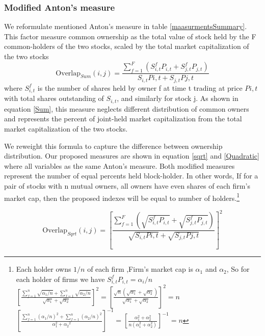\documentclass[12pt, a4paper]{article}
\begin{document}
\subsubsection{Modified Anton's measure }
We reformulate mentioned Anton's measure in table \ref{maasurmentsSummary}. This factor measure common ownership as the total value of
stock held by the F common-holders of the two stocks, scaled by the total market capitalization of the two stocks
\begin{equation}
	\text{Overlap}_{Sum}(i, j) = \frac{\sum_{f = 1}^{F} (S^f_{i,t}P_{i,t}+S^f_{j,t}P_{j,t})}{S_{i,t}P{i,t} + S_{j,t}P{j,t}}
	\label{Sum}
\end{equation}
where $ S^f_{i,t}$ is the number of shares held by owner f
at time t trading at price $ P{i,t} $ with total shares outstanding of $ S_{i,t} $, and similarly for stock j. 
As shown in equation \ref{Sum}, this measure neglects different distribution of common owners and represents the percent of joint-held market capitalization from the total market capitalization of the two stocks.

We reweight this formula to capture the difference between ownership distribution. Our proposed measures are shown in equation \ref{sqrt} and \ref{Quadratic} where all variables as the same Anton's measure. Both modified measures represent the number of equal percents held block-holder. In other words, If for a pair of stocks with n mutual owners, all owners have even shares of each firm's market cap, then the proposed indexes will be equal to number of holders.\footnote{ \tiny
	Each holder owns $ 1/n $ of each firm ,Firm's market cap is $ \alpha_1 $ and $ \alpha_2 $, So for each holder of firms we have $ S^f_{i,t}P_{i,t} = \alpha_i/n $\\
	$
	[  \frac{\sum_{f=1}^{n} \sqrt{\alpha_1/n}+\sum_{f=1}^{n} \sqrt{\alpha_2/n}}{\sqrt{\alpha_1} + \sqrt{\alpha_2}}]^2 
	= [\frac{\sqrt{n}(\sqrt{\alpha_1} +\sqrt{\alpha_2 })}{\sqrt{\alpha_1} + \sqrt{\alpha_2}}]^2 = n $
	\\
	$
	[\frac{\sum_{f=1}^{n} {(\alpha_1/n)^2}+\sum_{f=1}^{n} {(\alpha_2/n)^2}}{\alpha_1^2 +{\alpha_2}^2}]^{-1} = [\frac{{\alpha_1^2 + \alpha_2^2 }}{n(\alpha_1^2 + \alpha_2^2)}]^{-1} = n
	$
}



\begin{equation}
	\text{Overlap}_{Sqrt}(i, j) =  [\frac{\sum_{f =1}^{F}(\sqrt{S^f_{i,t}P_{i,t}}+\sqrt{S^f_{j,t}P_{j,t}})}{\sqrt{S_{i,t}P{i,t}} + \sqrt{S_{j,t}P{j,t}}}]^2 
	\label{sqrt}
\end{equation}
\end{document}
